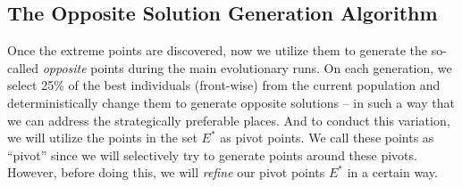\documentclass{sig-alternate-05-2015}
\begin{document}
\subsection{The Opposite Solution Generation Algorithm}
\label{sec:generate-pivot-points}
Once the extreme points are discovered, now we utilize them to generate the so-called \textit{opposite} points during the main evolutionary runs. On each generation, we select 25\% of the best individuals (front-wise) from the current population and deterministically change them to generate opposite solutions -- in such a way that we can address the strategically preferable places. And to conduct this variation, we will utilize the points in the set \(E^\ast\) as pivot points. We call these points as ``pivot'' since we will selectively try to generate points around these pivots. However, before doing this, we will \textit{refine} our pivot points \(E^\ast\) in a certain way. 
\end{document}
